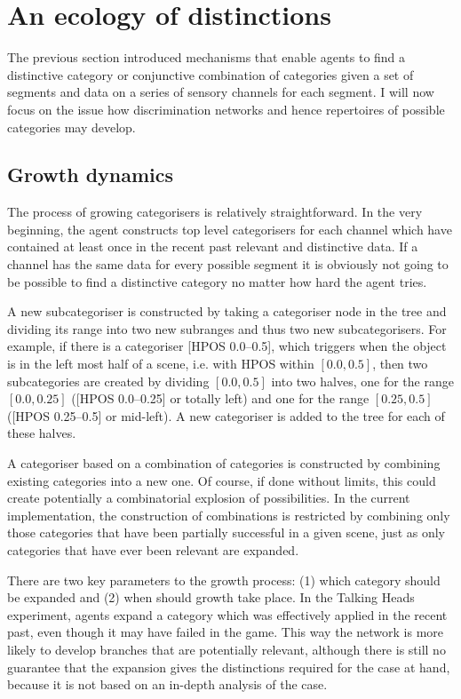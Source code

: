 \section{An ecology of distinctions}

The previous section introduced mechanisms that 
enable agents to find a distinctive category or
conjunctive combination of categories given 
a set of segments and data on a series of sensory 
channels for each segment. I will now focus on the 
issue how discrimination networks and hence
repertoires of possible categories may develop. 

\subsection{Growth dynamics}

The process of growing categorisers is relatively
straightforward. In the very beginning, the agent
constructs top level categorisers for each channel which 
have contained at least once 
in the recent past relevant and distinctive
data. If a channel has the same data for every 
possible segment it is obviously not going to be 
possible to find a distinctive category no matter
how hard the agent tries. 

A new subcategoriser is constructed by taking a
categoriser node in the tree and dividing its range into 
two new subranges and thus two new subcategorisers.
For example, if there is a 
categoriser [HPOS 0.0–0.5], which triggers when the 
object is in the left most half of a scene, i.e. with HPOS
within $[0.0,0.5]$, then two 
subcategories are created by dividing $[0.0,0.5]$
into two halves, one for the 
range $[0.0,0.25]$ ([HPOS 0.0–0.25] or totally left) 
and one for the range $[0.25,0.5]$ ([HPOS 0.25--0.5] or mid-left). 
A new categoriser is added to the tree for each of these
halves. 

A categoriser based on a combination of categories is 
constructed by combining existing categories into a new one. 
Of course, if done without limits, this could create potentially 
a combinatorial explosion of possibilities. In the 
current implementation, the construction of combinations
is restricted by combining only those categories that 
have been partially successful in a given scene, 
just as only categories that
have ever been relevant are expanded. 

There are two key parameters to the growth process: 
(1) which category should be expanded and (2) when should
growth take place. In the Talking Heads experiment, agents expand 
a category which was effectively applied in the 
recent past, even though it may have failed in the game. 
This way the network is more likely to 
develop branches that are potentially relevant, although 
there is still no guarantee that the expansion
gives the distinctions required for the case at hand, 
because it is not based on an in-depth analysis of 
the case. 

